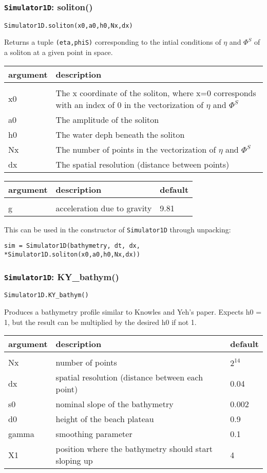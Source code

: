 \documentclass[10pt,a4paper]{article}
\newenvironment{arglist}
    {\begin{center}
    \begin{tabular}{l|p{12cm}}
    argument & description\\
    \hline\\
    }
    { 
    \end{tabular} 
    \end{center}
    }
\newenvironment{optarglist}
    {\begin{center}
    \begin{tabular}{l|p{10cm}|l}
    argument & description & default\\
    \hline\\
    }
    { 
    \end{tabular} 
    \end{center}
    }
\begin{document}
\subsubsection{\texttt{Simulator1D}: soliton()}
\texttt{Simulator1D.soliton(x0,a0,h0,Nx,dx)}

Returns a tuple \texttt{(eta,phiS)} corresponding to the intial conditions of $\eta$ and $\Phi^S$ of a soliton at a given point in space.

\begin{arglist}
        x0   & The x coordinate of the soliton, where
                x=0 corresponds with an index of 0 in the vectorization
                of $\eta$ and $\Phi^S$\\\hline
        a0   & The amplitude of the soliton\\\hline
        h0   & The water deph beneath the soliton\\\hline
        Nx   & The number of points in the vectorization of $\eta$ and $\Phi^S$\\\hline
        dx   & The spatial resolution (distance between points)\\\hline
\end{arglist}

\begin{optarglist}
g & acceleration due to gravity & 9.81\\
\end{optarglist}

This can be used in the constructor of \texttt{Simulator1D} through unpacking:

\texttt{sim = Simulator1D(bathymetry, dt, dx, *Simulator1D.soliton(x0,a0,h0,Nx,dx))}





\subsubsection{\texttt{Simulator1D}: KY\_bathym()}
\texttt{Simulator1D.KY\_bathym()}

Produces a bathymetry profile similar to Knowles and Yeh's paper.
        Expects h0 = 1, but the result can be multiplied by the desired h0 if not 1.

\begin{optarglist}

        Nx    & number of points & $2^{14}$\\\hline
        dx    & spatial resolution (distance between each point) & 0.04\\\hline
        s0    &  nominal slope of the bathymetry & 0.002 \\\hline
        d0    & height of the beach plateau & 0.9 \\\hline
        gamma & smoothing parameter & 0.1 \\\hline
        X1    & position where the bathymetry should start sloping up & 4\\\hline
\end{optarglist}
\end{document}
